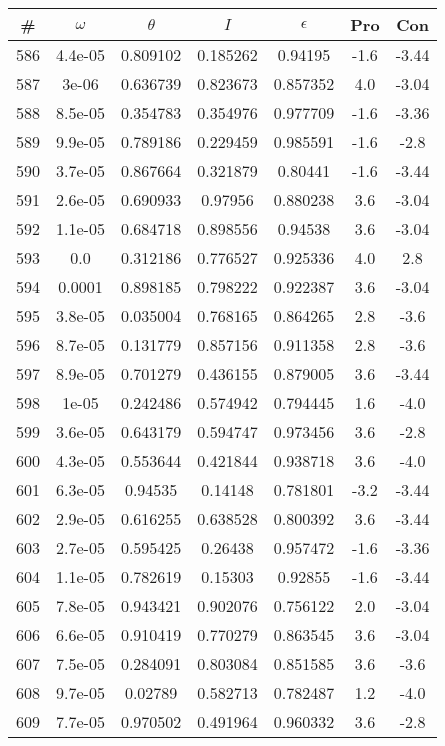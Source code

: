 \begin{table}
\begin{tabular}{c|c|c|c|c|c|c}
\# & $\omega$ & $\theta$ & $I$ & $\epsilon$ & Pro & Con\\
\hline
586 & 4.4e-05 & 0.809102 & 0.185262 & 0.94195 & -1.6 & -3.44\\
587 & 3e-06 & 0.636739 & 0.823673 & 0.857352 & 4.0 & -3.04\\
588 & 8.5e-05 & 0.354783 & 0.354976 & 0.977709 & -1.6 & -3.36\\
589 & 9.9e-05 & 0.789186 & 0.229459 & 0.985591 & -1.6 & -2.8\\
590 & 3.7e-05 & 0.867664 & 0.321879 & 0.80441 & -1.6 & -3.44\\
591 & 2.6e-05 & 0.690933 & 0.97956 & 0.880238 & 3.6 & -3.04\\
592 & 1.1e-05 & 0.684718 & 0.898556 & 0.94538 & 3.6 & -3.04\\
593 & 0.0 & 0.312186 & 0.776527 & 0.925336 & 4.0 & 2.8\\
594 & 0.0001 & 0.898185 & 0.798222 & 0.922387 & 3.6 & -3.04\\
595 & 3.8e-05 & 0.035004 & 0.768165 & 0.864265 & 2.8 & -3.6\\
596 & 8.7e-05 & 0.131779 & 0.857156 & 0.911358 & 2.8 & -3.6\\
597 & 8.9e-05 & 0.701279 & 0.436155 & 0.879005 & 3.6 & -3.44\\
598 & 1e-05 & 0.242486 & 0.574942 & 0.794445 & 1.6 & -4.0\\
599 & 3.6e-05 & 0.643179 & 0.594747 & 0.973456 & 3.6 & -2.8\\
600 & 4.3e-05 & 0.553644 & 0.421844 & 0.938718 & 3.6 & -4.0\\
601 & 6.3e-05 & 0.94535 & 0.14148 & 0.781801 & -3.2 & -3.44\\
602 & 2.9e-05 & 0.616255 & 0.638528 & 0.800392 & 3.6 & -3.44\\
603 & 2.7e-05 & 0.595425 & 0.26438 & 0.957472 & -1.6 & -3.36\\
604 & 1.1e-05 & 0.782619 & 0.15303 & 0.92855 & -1.6 & -3.44\\
605 & 7.8e-05 & 0.943421 & 0.902076 & 0.756122 & 2.0 & -3.04\\
606 & 6.6e-05 & 0.910419 & 0.770279 & 0.863545 & 3.6 & -3.04\\
607 & 7.5e-05 & 0.284091 & 0.803084 & 0.851585 & 3.6 & -3.6\\
608 & 9.7e-05 & 0.02789 & 0.582713 & 0.782487 & 1.2 & -4.0\\
609 & 7.7e-05 & 0.970502 & 0.491964 & 0.960332 & 3.6 & -2.8\\

\end{tabular}
\end{table}

